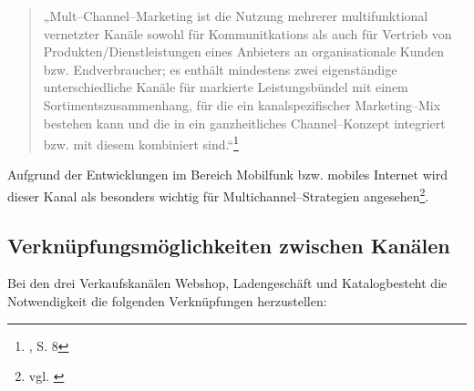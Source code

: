 \begin{quote}„Mult--Channel--Marketing ist die Nutzung mehrerer multifunktional vernetzter Kanäle sowohl für Kommunitkations als auch für Vertrieb von Produkten/Dienstleistungen eines Anbieters an organisationale Kunden bzw. Endverbraucher; es enthält mindestens zwei eigenständige unterschiedliche Kanäle für markierte Leistungsbündel mit einem Sortimentszusammenhang, für die ein kanalspezifischer Marketing--Mix bestehen kann und die in ein ganzheitliches Channel--Konzept integriert bzw. mit diesem kombiniert sind.“\footnote{\cite{emrich}, S. 8}\end{quote} 

Aufgrund der Entwicklungen im Bereich Mobilfunk bzw. mobiles Internet wird dieser Kanal als besonders wichtig für Multichannel--Strategien angesehen\footnote{vgl. \cite{mohlenbruch}}.

\subsection{Verknüpfungsmöglichkeiten zwischen Kanälen}

Bei den drei Verkaufskanälen Webshop, Ladengeschäft und Katalogbesteht die Notwendigkeit die folgenden Verknüpfungen herzustellen:

